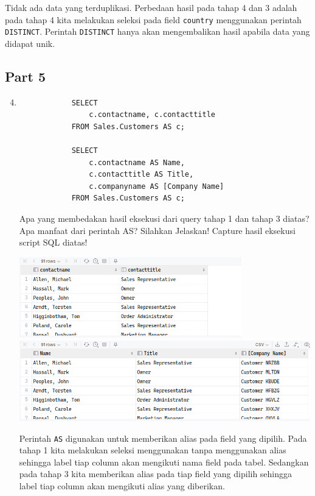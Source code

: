 \documentclass[12pt,titlepage]{article}
\begin{document}
\begin{enumerate}
{        Tidak ada data yang terduplikasi. Perbedaan hasil pada tahap 4 dan 3 adalah pada tahap 4 kita melakukan seleksi pada field \texttt{country}
        menggunakan perintah \texttt{DISTINCT}. Perintah \texttt{DISTINCT} hanya akan mengembalikan hasil apabila data yang didapat unik.
    }
\end{enumerate}

\subsection{Part 5}
\begin{enumerate}
    \setcounter{enumi}{3}
    \item {
        \begin{verbatim}
            SELECT
                c.contactname, c.contacttitle
            FROM Sales.Customers AS c;

            SELECT
                c.contactname AS Name,
                c.contacttitle AS Title,
                c.companyname AS [Company Name]
            FROM Sales.Customers AS c;
        \end{verbatim}
        Apa yang membedakan hasil eksekusi dari query tahap 1 dan tahap 3 diatas? Apa
        manfaat dari perintah AS? Silahkan Jelaskan! Capture hasil eksekusi script SQL diatas!

        \begin{center}
            \includegraphics[height=3.5cm]{./images/p5.1-n1-a.png}\\
            \includegraphics[height=3.5cm]{./images/p5.1-n1-b.png}\\
        \end{center}

        Perintah \texttt{AS} digunakan untuk memberikan alias pada field yang dipilih. Pada tahap 1 kita melakukan seleksi menggunakan
        tanpa menggunakan alias sehingga label tiap column akan mengikuti nama field pada tabel. Sedangkan pada tahap 3 kita memberikan alias
        pada tiap field yang dipilih sehingga label tiap column akan mengikuti alias yang diberikan.
    }
\end{enumerate}
\end{document}

